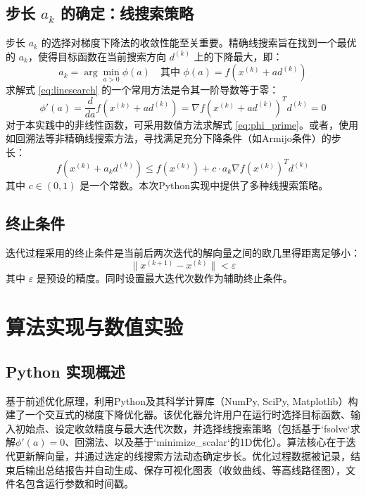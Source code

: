 \documentclass[12pt]{article} %
\begin{document}
\subsection{步长 \(a_k\) 的确定：线搜索策略}
步长 \(a_k\) 的选择对梯度下降法的收敛性能至关重要。精确线搜索旨在找到一个最优的 \(a_k\)，使得目标函数在当前搜索方向 \(d^{(k)}\) 上的下降最大，即：
\begin{equation}
    a_k = \arg\min_{a > 0} \phi(a) \quad \text{其中 } \phi(a) = f(x^{(k)} + a d^{(k)})
    \label{eq:linesearch}
\end{equation}
求解式 \eqref{eq:linesearch} 的一个常用方法是令其一阶导数等于零：
\begin{equation}
    \phi'(a) = \frac{d}{da} f(x^{(k)} + a d^{(k)}) = \nabla f(x^{(k)} + a d^{(k)})^T d^{(k)} = 0
    \label{eq:phi_prime}
\end{equation}
对于本实践中的非线性函数，可采用数值方法求解式 \eqref{eq:phi_prime}。或者，使用如回溯法等非精确线搜索方法，寻找满足充分下降条件（如Armijo条件）的步长：
\begin{equation}
    f(x^{(k)} + a_k d^{(k)}) \leq f(x^{(k)}) + c \cdot a_k \nabla f(x^{(k)})^T d^{(k)}
    \label{eq:armijo}
\end{equation}
其中 \(c \in (0, 1)\) 是一个常数。本次Python实现中提供了多种线搜索策略。

\subsection{终止条件}
迭代过程采用的终止条件是当前后两次迭代的解向量之间的欧几里得距离足够小：
\begin{equation}
    \|x^{(k+1)} - x^{(k)}\| < \varepsilon
    \label{eq:termination}
\end{equation}
其中 \(\varepsilon\) 是预设的精度。同时设置最大迭代次数作为辅助终止条件。

\section{算法实现与数值实验}
\subsection{Python 实现概述}
基于前述优化原理，利用Python及其科学计算库（NumPy, SciPy, Matplotlib）构建了一个交互式的梯度下降优化器。该优化器允许用户在运行时选择目标函数、输入初始点、设定收敛精度与最大迭代次数，并选择线搜索策略（包括基于`fsolve`求解\(\phi'(a)=0\)、回溯法、以及基于`minimize\_scalar`的1D优化）。算法核心在于迭代更新解向量，并通过选定的线搜索方法动态确定步长。优化过程数据被记录，结束后输出总结报告并自动生成、保存可视化图表（收敛曲线、等高线路径图），文件名包含运行参数和时间戳。
\end{document}
